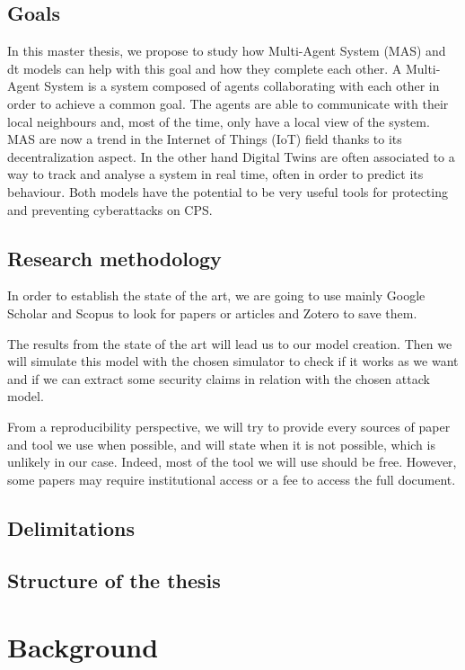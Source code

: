 \documentclass[12pt]{report}
\begin{document}
\section{Goals}
\label{sec:intr.goal}
In this master thesis, we propose to study how Multi-Agent System (MAS) and \gls{dt} models can help with this goal and how they complete each other. A Multi-Agent System is a system composed of agents collaborating with each other in order to achieve a common goal. The agents are able to communicate with their local neighbours and, most of the time, only have a local view of the system. MAS are now a trend in the Internet of Things (IoT) field thanks to its decentralization aspect. In the other hand Digital Twins are often associated to a way to track and analyse a system in real time, often in order to predict its behaviour. Both models have the potential to be very useful tools for protecting and preventing cyberattacks on CPS.

\section{Research methodology}
\label{sec:intr:metho}
In order to establish the state of the art, we are going to use mainly Google Scholar and Scopus to look for papers or articles and Zotero to save them. 

The results from the state of the art will lead us to our model creation. Then we will simulate this model with the chosen simulator to check if it works as we want and if we can extract some security claims in relation with the chosen attack model.

From a reproducibility perspective, we will try to provide every sources of paper and tool we use when possible, and will state  when it is not possible, which is unlikely in our case. Indeed, most of the tool we will use should be free. However, some papers may require institutional access or a fee to access the full document.

\section{Delimitations}
\label{sec:intr:delim}
% 


\section{Structure of the thesis}
\label{sec:intr:struct}

\chapter{Background}
\end{document}
